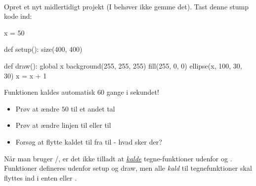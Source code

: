 \documentclass{ucph-handout}
\newcounter{handout}
\newcommand{\Ark}{Ark \#\arabic{handout} -- }
\renewcommand{\Title}{\Ark Tegn med Processing.py}%
\begin{document}
~

\newpage
{}
\renewcommand{\Title}{\Ark Animation og funktionerne \ttpy{setup}/\ttpy{draw}}

\begin{exercisebox}[adjusted title=Simpel animation]
Opret et nyt midlertidigt projekt (I behøver ikke gemme det). Tast
denne stump kode ind:
\begin{python}
x = 50
  
def setup():
    size(400, 400)

def draw():
    global x
    background(255, 255, 255)
    fill(255, 0, 0)
    ellipse(x, 100, 30, 30)
    x = x + 1
\end{python}

\noindent
Funktionen  kaldes automatisk 60 gange i sekundet!

\begin{itemize}
\item Prøv at ændre $50$ til et andet tal 
\item Prøv at ændre linjen  til  eller til 
\item Forsøg at flytte kaldet til  fra 
  til  - hvad sker der?
\end{itemize}

\noindent
{}
Når man bruger /, er det ikke
tilladt at \underline{\textit{kalde}} tegne-funktioner udenfor
 og . Funktioner defineres udenfor setup og
draw, men alle \textit{kald} til tegnefunktioner skal flyttes ind i
enten  eller .
\end{exercisebox}
\end{document}
